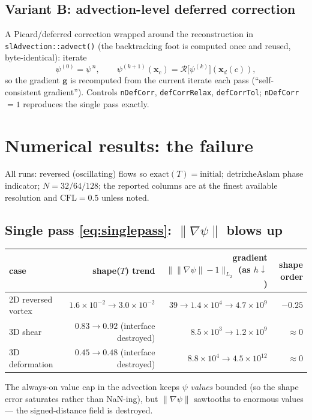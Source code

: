\documentclass[11pt]{article}
\newcommand{\gradpsi}{\lVert\nabla\psi\rVert}
\newcommand{\code}[1]{\texttt{#1}}
\begin{document}
\subsection{Variant B: advection-level deferred correction}
A Picard/deferred correction wrapped around the reconstruction in
\code{slAdvection::advect()} (the backtracking foot is computed once and reused,
byte-identical): iterate
\begin{equation}
\psi^{(0)}=\psi^{\,n},\qquad
\psi^{(k+1)}(\mathbf{x}_c)=
\mathcal{R}\!\big[\psi^{(k)}\big](\mathbf{x}_d(c)),
\label{eq:picard}
\end{equation}
so the gradient $\mathbf{g}$ is recomputed from the current iterate each pass
(``self-consistent gradient''). Controls \code{nDefCorr}, \code{defCorrRelax},
\code{defCorrTol}; \code{nDefCorr}$=1$ reproduces the single pass exactly.

\section{Numerical results: the failure}

All runs: reversed (oscillating) flows so $\text{exact}(T)=\text{initial}$;
detrixheAslam phase indicator; $N=32/64/128$; the reported columns are at the
finest available resolution and $\mathrm{CFL}=0.5$ unless noted.

\subsection{Single pass \eqref{eq:singlepass}: $\gradpsi$ blows up}
\begin{center}
\begin{tabular}{l r r r}
\toprule
case & shape($T$) trend & gradient $\lVert\gradpsi-1\rVert_{L_2}$ (as $h\downarrow$) & shape order \\
\midrule
2D reversed vortex & $1.6\!\times\!10^{-2}\!\to\!3.0\!\times\!10^{-2}$ & $39 \to 1.4\!\times\!10^{4}\to 4.7\!\times\!10^{9}$ & $-0.25$ \\
3D shear           & $0.83 \to 0.92$ (interface destroyed) & $8.5\!\times\!10^{3}\to 1.2\!\times\!10^{9}$ & $\approx 0$ \\
3D deformation     & $0.45 \to 0.48$ (interface destroyed) & $8.8\!\times\!10^{4}\to 4.5\!\times\!10^{12}$ & $\approx 0$ \\
\bottomrule
\end{tabular}
\end{center}
The always-on value cap in the advection keeps $\psi$ \emph{values} bounded (so the
shape error saturates rather than NaN-ing), but $\gradpsi$ sawtooths to enormous
values --- the signed-distance field is destroyed.
\end{document}
